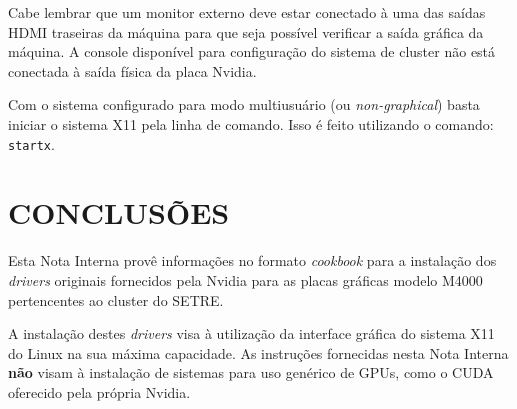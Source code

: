 \documentclass[twoside,a4paper,12pt,english]{inac17}
\begin{document}
Cabe lembrar que um monitor externo deve estar conectado à uma das saídas HDMI 
traseiras da máquina para que seja possível verificar a saída gráfica da máquina. 
A console disponível para configuração do sistema de cluster não está conectada 
à saída física da placa Nvidia.

Com o sistema configurado para modo multiusuário (ou \textit{non-graphical}) 
basta iniciar o sistema X11 pela linha de comando. Isso é feito utilizando o comando: 
\texttt{startx}.

\section{CONCLUSÕES}

Esta Nota Interna provê informações no formato \textit{cookbook} para a instalação 
dos \textit{drivers} originais fornecidos pela Nvidia para as placas gráficas modelo M4000 pertencentes ao cluster do SETRE.

A instalação destes \textit{drivers} visa à utilização da interface gráfica do 
sistema X11 do Linux na sua máxima capacidade. As instruções fornecidas nesta Nota 
Interna \textbf{não} visam à instalação de sistemas para uso genérico de GPUs, 
como o CUDA oferecido pela própria Nvidia.




\end{document}
